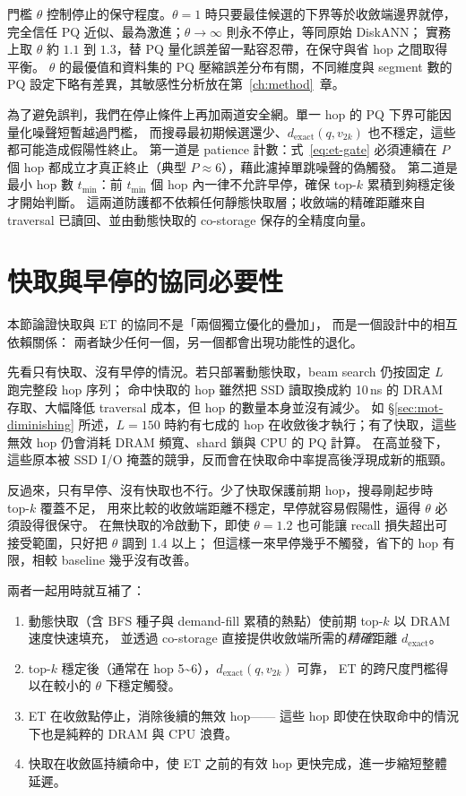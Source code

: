 門檻 $\theta$ 控制停止的保守程度。$\theta=1$ 時只要最佳候選的下界等於收斂端邊界就停，完全信任 PQ 近似、最為激進；$\theta\to\infty$ 則永不停止，等同原始 DiskANN；
實務上取 $\theta$ 約 $1.1$ 到 $1.3$，替 PQ 量化誤差留一點容忍帶，在保守與省 hop 之間取得平衡。
$\theta$ 的最優值和資料集的 PQ 壓縮誤差分布有關，不同維度與 segment 數的 PQ 設定下略有差異，其敏感性分析放在第~\ref{ch:method}~章。

為了避免誤判，我們在停止條件上再加兩道安全網。單一 hop 的 PQ 下界可能因量化噪聲短暫越過門檻，
而搜尋最初期候選還少、$d_\text{exact}(q, v_{2k})$ 也不穩定，這些都可能造成假陽性終止。
第一道是 patience 計數：式~\eqref{eq:et-gate} 必須連續在 $P$ 個 hop 都成立才真正終止（典型 $P \approx 6$），藉此濾掉單跳噪聲的偽觸發。
第二道是最小 hop 數 $t_\text{min}$：前 $t_\text{min}$ 個 hop 內一律不允許早停，確保 top-$k$ 累積到夠穩定後才開始判斷。
這兩道防護都不依賴任何靜態快取層；收斂端的精確距離來自 traversal 已讀回、並由動態快取的 co-storage 保存的全精度向量。

\section{快取與早停的協同必要性}
\label{sec:codesign}

本節論證快取與 ET 的協同不是「兩個獨立優化的疊加」，
而是一個設計中的相互依賴關係：
兩者缺少任何一個，另一個都會出現功能性的退化。

先看只有快取、沒有早停的情況。若只部署動態快取，beam search 仍按固定 $L$ 跑完整段 hop 序列；
命中快取的 hop 雖然把 SSD 讀取換成約 10\,ns 的 DRAM 存取、大幅降低 traversal 成本，但 hop 的數量本身並沒有減少。
如 §\ref{sec:mot-diminishing} 所述，$L=150$ 時約有七成的 hop 在收斂後才執行；有了快取，這些無效 hop 仍會消耗 DRAM 頻寬、shard 鎖與 CPU 的 PQ 計算。
在高並發下，這些原本被 SSD I/O 掩蓋的競爭，反而會在快取命中率提高後浮現成新的瓶頸。

反過來，只有早停、沒有快取也不行。少了快取保護前期 hop，搜尋剛起步時 top-$k$ 覆蓋不足，
用來比較的收斂端距離不穩定，早停就容易假陽性，逼得 $\theta$ 必須設得很保守。
在無快取的冷啟動下，即使 $\theta=1.2$ 也可能讓 recall 損失超出可接受範圍，只好把 $\theta$ 調到 1.4 以上；
但這樣一來早停幾乎不觸發，省下的 hop 有限，相較 baseline 幾乎沒有改善。

兩者一起用時就互補了：

\begin{enumerate}
  \item 動態快取（含 BFS 種子與 demand-fill 累積的熱點）使前期 top-$k$ 以 DRAM 速度快速填充，
    並透過 co-storage 直接提供收斂端所需的\emph{精確}距離 $d_\text{exact}$。
  \item top-$k$ 穩定後（通常在 hop 5\textasciitilde 6），$d_\text{exact}(q, v_{2k})$ 可靠，
    ET 的跨尺度門檻得以在較小的 $\theta$ 下穩定觸發。
  \item ET 在收斂點停止，消除後續的無效 hop——
    這些 hop 即使在快取命中的情況下也是純粹的 DRAM 與 CPU 浪費。
  \item 快取在收斂區持續命中，使 ET 之前的有效 hop 更快完成，進一步縮短整體延遲。
\end{enumerate}

